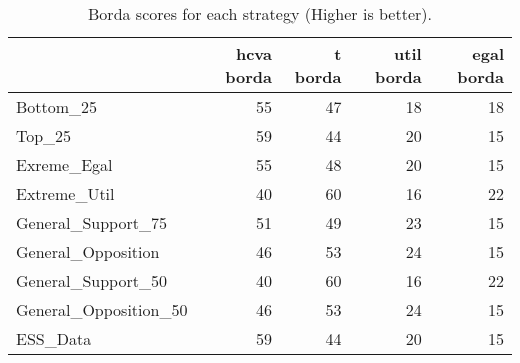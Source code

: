 \begin{table}
\caption{Borda scores for each strategy (Higher is better).}
\begin{tabular}{lrrrr}
\toprule
 & hcva borda & t borda & util borda & egal borda \\
\midrule
Bottom_25 & 55 & 47 & 18 & 18 \\
Top_25 & 59 & 44 & 20 & 15 \\
Exreme_Egal & 55 & 48 & 20 & 15 \\
Extreme_Util & 40 & 60 & 16 & 22 \\
General_Support_75 & 51 & 49 & 23 & 15 \\
General_Opposition & 46 & 53 & 24 & 15 \\
General_Support_50 & 40 & 60 & 16 & 22 \\
General_Opposition_50 & 46 & 53 & 24 & 15 \\
ESS_Data & 59 & 44 & 20 & 15 \\
\bottomrule
\end{tabular}
\end{table}
